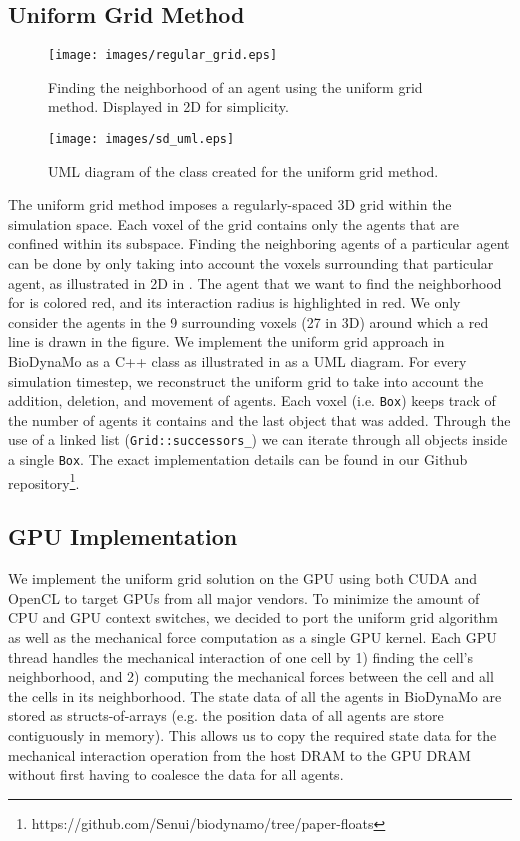 \documentclass[conference]{IEEEtran}
\begin{document}
\subsection{Uniform Grid Method}

\begin{figure}[!t]
    \centering
    \texttt{[image: images/regular\_grid.eps]}
    \caption{Finding the neighborhood of an agent using the uniform grid method. Displayed in 2D for simplicity.}
    \label{fig:regular_grid}
\end{figure}

\begin{figure}[!hbt]
    \centering
    \texttt{[image: images/sd\_uml.eps]}
    \caption{UML diagram of the class created for the uniform grid method.}
    \label{fig:sd_uml}
\end{figure}

The uniform grid method imposes a regularly-spaced 3D grid within the simulation space.
Each voxel of the grid contains only the agents that are confined within its subspace.
Finding the neighboring agents of a particular agent can be done by only taking into account the voxels surrounding that particular agent, as illustrated in 2D in .
The agent that we want to find the neighborhood for is colored red, and its interaction radius is highlighted in red.
We only consider the agents in the 9 surrounding voxels (27 in 3D) around which a red line is drawn in the figure.
We implement the uniform grid approach in BioDynaMo as a C++ class as illustrated in  as a UML diagram.
For every simulation timestep, we reconstruct the uniform grid to take into account the addition, deletion, and movement of agents.
Each voxel (i.e. \texttt{Box}) keeps track of the number of agents it contains and the last object that was added.
Through the use of a linked list (\texttt{Grid::successors\_}) we can iterate through all objects inside a single \texttt{Box}.
The exact implementation details can be found in our Github repository\footnote{https://github.com/Senui/biodynamo/tree/paper-floats}.

\subsection{GPU Implementation}
\par We implement the uniform grid solution on the GPU using both CUDA and OpenCL to target GPUs from all major vendors.
To minimize the amount of CPU and GPU context switches, we decided to port the uniform grid algorithm as well as the mechanical force computation as a single GPU kernel.
Each GPU thread handles the mechanical interaction of one cell by 1) finding the cell's neighborhood, and 2) computing the mechanical forces between the cell and all the cells in its neighborhood.
The state data of all the agents in BioDynaMo are stored as structs-of-arrays (e.g. the position data of all agents are store contiguously in memory).
This allows us to copy the required state data for the mechanical interaction operation from the host DRAM to the GPU DRAM without first having to coalesce the data for all agents.
\end{document}
